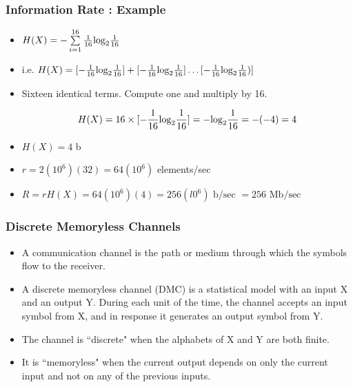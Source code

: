 \documentclass[a4]{beamer}
\begin{document}
\begin{frame}
\frametitle{Information Rate : Example}
\begin{itemize}
\item $H(X) = - \sum \limits^{16}_{i=1} {1\over16} \mbox{log}_2{1\over16}$ \bigskip

\item i.e. $H(X) = [ -{1\over16} \mbox{log}_2{1\over16} ] + [- {1\over16} \mbox{log}_2{1\over16} ] \ldots [ -{1\over16} \mbox{log}_2{1\over16}) ] $ \bigskip
\item Sixteen identical terms. Compute one and multiply by 16.

\[ H(X) = 16 \times [ -{1\over16} \mbox{log}_2{1\over16} ]  = -\mbox{log}_2{1\over16} = -(-4) = 4\] \bigskip
\item $H(X)= 4$ b
\item $r =  2(10^6)(32) = 64(10^6)$ elements/sec \bigskip

\item $R = rH(X) = 64(10^6)(4) = 256(l0^6) \mbox{ b/sec } = 256 \mbox{ Mb/sec }$ \bigskip
\end{itemize}
\end{frame}
\begin{frame} \frametitle{Discrete Memoryless Channels}
\begin{itemize}
\item A communication channel is the path or medium through which the symbols flow to the receiver. \item A discrete memoryless channel (DMC) is a statistical model with an input X and an output Y.
During each unit of the time, the channel accepts an input symbol from X, and in
response it generates an output symbol from Y. \item  The channel is ``discrete" when the alphabets of X and
Y are both finite.\item It is ``memoryless" when the current output depends on only the current input and
not on any of the previous inputs.\end{itemize}
\end{frame}

\end{document}
